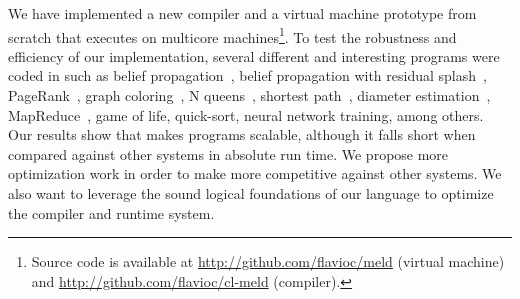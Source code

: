 \begin{itemize}
   We have implemented a new compiler and a virtual machine prototype from scratch that executes on multicore machines\footnote{Source code is available at \url{http://github.com/flavioc/meld} (virtual machine) and \url{http://github.com/flavioc/cl-meld} (compiler).}.
   To test the robustness and efficiency of our implementation, several different
   and interesting programs were coded in \lang such as belief propagation~\cite{Gonzalez+al:aistats09paraml},
   belief propagation with residual splash~\cite{Gonzalez+al:aistats09paraml}, PageRank~\cite{Page:2001:MNR},
   graph coloring~\cite{PSP:2032868}, N queens~\cite{8queens}, shortest path~\cite{Dijkstra}, diameter estimation~\cite{5234320}, MapReduce~\cite{Dean:2008:MSD:1327452.1327492}, game of life, quick-sort, neural network training, among others. Our results show that \lang makes programs scalable, although it falls short when compared against other systems in absolute run time. We propose more optimization work
   in order to make \lang more competitive against other systems. We also want to leverage the sound logical
   foundations of our language to optimize the compiler and runtime system.
   
\end{itemize}
